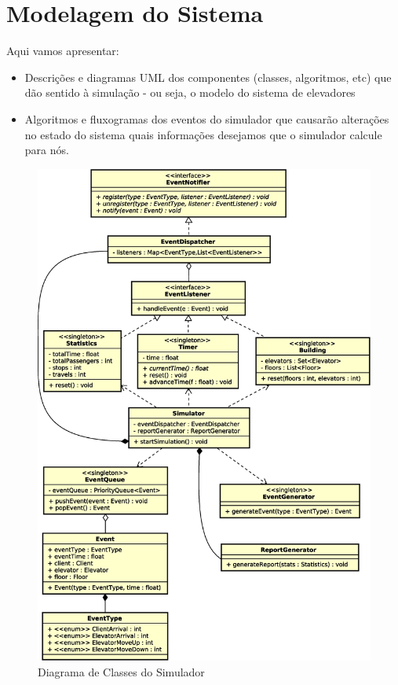 \chapter{\label{chap:modeling}Modelagem do Sistema}

Aqui vamos apresentar:

\begin{itemize}
  \item Descrições e diagramas UML dos componentes (classes, algoritmos, etc)
que dão sentido à simulação - ou seja, o modelo do sistema de elevadores
  \item Algoritmos e fluxogramas dos eventos do simulador que causarão
alterações no estado do sistema quais informações desejamos que o simulador
calcule para nós.
\end{itemize}

\begin{figure}[htb!]
  \centering
  \includegraphics[scale=0.6]{img/simulator_diagram.eps}
  \caption{Diagrama de Classes do Simulador}
\label{fig:diagram:simulator}
\end{figure}

